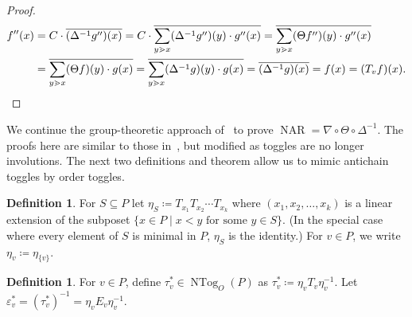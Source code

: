 \documentclass[10pt]{amsart}
\theoremstyle{definition}
\newtheorem{defi}[theo]{Definition}
\newcommand{\e}{\varepsilon}
\newcommand{\down}{\nabla}
\newcommand{\up}{\Delta}
\DeclareMathOperator{\ntog}{NTog}
\DeclareMathOperator{\NAR}{NAR}
\begin{document}
\begin{proof}
\begin{align*}
f''(x) &=
C\cdot \overline{(\up^{-1}g'')(x)}
=
C\cdot \overline{\sum\limits_{y\gtrdot x}(\up^{-1}g'')(y)
\cdot g''(x)}
=
\overline{\sum\limits_{y\gtrdot x}(\Theta f'')(y)
\cdot g''(x)}\\
&=
\overline{\sum\limits_{y\gtrdot x}(\Theta f)(y)
\cdot g(x)}
=
\overline{\sum\limits_{y\gtrdot x}(\up^{-1}g)(y)
\cdot g(x)}
=
\overline{(\up^{-1}g)(x)}
=f(x)
=(T_v f)(x).\qedhere
\end{align*}
\end{proof}

We continue the group-theoretic approach of~\cite{antichain-toggling} to prove
$\NAR=\down\circ\Theta\circ\up^{-1}$.
The proofs here are similar to those
in~\cite{antichain-toggling}, but modified as
toggles are no longer involutions. The next two definitions and theorem allow us to mimic antichain toggles by order toggles. 

\begin{defi}
For $S\subseteq P$ let $\eta_S\coloneqq T_{x_1}T_{x_2}\cdots T_{x_k}$
where $(x_1,x_2,\dots,x_k)$ is a linear extension of the subposet 
$\{x\in P\;|\;x<y \text{ for some }y\in S\}$. (In the special case where every element of $S$ is minimal in $P$,
$\eta_S$ is the identity.) For $v\in P$, we write $\eta_v\coloneqq \eta_{\{v\}}$. 
\end{defi}

\begin{defi}
For $v\in P$, define $\tau_v^*\in\ntog_O(P)$ as $\tau_v^* \coloneqq \eta_v T_v \eta_v^{-1}$. Let $\e_v^*=\left(\tau_v^*\right)^{-1} = \eta_v E_v \eta_v^{-1}$.
\end{defi}
\end{document}
